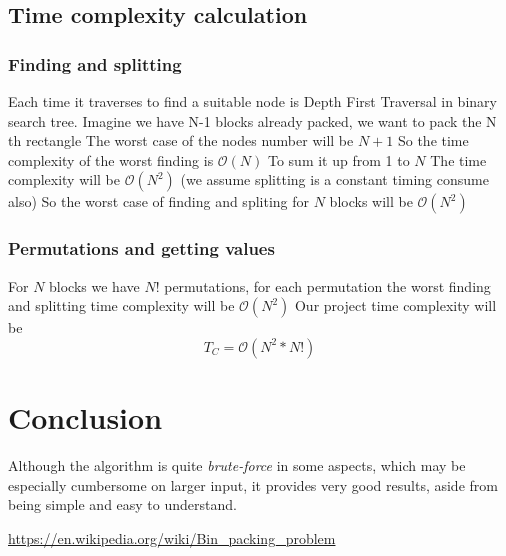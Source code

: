 \subsection{Time complexity calculation}

\subsubsection{Finding and splitting}
Each time it traverses to find a suitable node is  Depth First Traversal in binary search tree.
Imagine we have N-1 blocks already packed, we want to pack the N th rectangle
The worst case of the nodes number will be $N+1$
So the time complexity of the worst finding is $\mathcal{O}(N)$
To sum it up from 1 to $N$
The time complexity will be $\mathcal{O}(N^2)$
(we assume splitting is a constant timing consume also) 
So the worst case of finding and spliting for $N$ blocks
will be $\mathcal{O}(N^2)$

\subsubsection{Permutations and getting values}
For $N$ blocks we have $N!$ permutations, for each permutation the worst
finding and splitting time complexity will be $\mathcal{O}(N^2)$
Our project time complexity will be
$$T_C=\mathcal{O}(N^2*N!)$$

\section{Conclusion}
Although the algorithm is quite \textit{brute-force} in some aspects,
which may be especially cumbersome on larger input,
it provides very good results, aside from
being simple and easy to understand.

\newpage
\begin{thebibliography}{9}
	\url{https://en.wikipedia.org/wiki/Bin_packing_problem}
\end{thebibliography}


